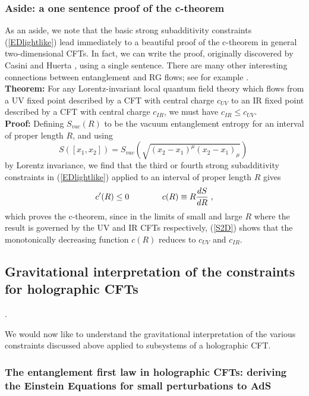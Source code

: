 \documentclass[12pt,epsf]{article}
\newcommand{\be}{\begin{equation}}
\newcommand{\ee}{\end{equation}}
\begin{document}
\subsubsection*{Aside: a one sentence proof of the c-theorem}

As an aside, we note that the basic strong subadditivity constraints (\ref{EDlightlike}) lead immediately to a beautiful proof of the c-theorem in general two-dimensional CFTs. In fact, we can write the proof, originally discovered by Casini and Huerta \cite{Casini:2004bw}, using a single sentence. There are many other interesting connections between entanglement and RG flows; see for example \cite{Myers:2010tj,Casini:2016fgb,Casini:2015woa}.
\\
\noindent
{\bf Theorem:} For any Lorentz-invariant local quantum field theory which flows from a UV fixed point described by a CFT with central charge $c_{UV}$ to an IR fixed point described by a CFT with central charge $c_{IR}$, we must have $c_{IR} \le c_{UV}$.
\\
\noindent
{\bf Proof:} Defining $S_{vac}(R)$ to be the vacuum entanglement entropy for an interval of proper length $R$, and using
\be
S([x_1,x_2]) = S_{vac}\left(\sqrt{(x_2 - x_1)^\mu (x_2 - x_1)_\mu}\right) \;
\ee
by Lorentz invariance, we find that the third or fourth strong subadditivity constraints in (\ref{EDlightlike}) applied to an interval of proper length $R$ gives
\be
\label{defC}
c'(R) \le 0 \qquad \qquad c(R) \equiv R {d S \over d R} \; ,
\ee
which proves the c-theorem, since in the limits of small and large $R$ where the result is governed by the UV and IR CFTs respectively, (\ref{S2D}) shows that the monotonically decreasing function $c(R)$ reduces to $c_{UV}$ and $c_{IR}$.

\subsection{Gravitational interpretation of the constraints for holographic CFTs}.

We would now like to understand the gravitational interpretation of the various constraints discussed above applied to subsystems of a holographic CFT.

\subsubsection{The entanglement first law in holographic CFTs: deriving the Einstein Equations for small perturbations to AdS}
\end{document}
